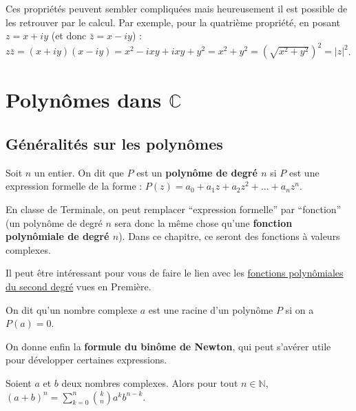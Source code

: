 	\begin{tip}
		Ces propriétés peuvent sembler compliquées mais heureusement il est possible de les retrouver par le calcul. Par exemple, pour la quatrième propriété, en posant $z = x+iy$ (et donc $\bar{z} = x-iy$) :
		\newpar
		$z\bar{z} = (x+iy)(x-iy) = x^2 - ixy + ixy + y^2 = x^2 + y^2 = \left(\sqrt{x^2 + y^2}\right)^2 = |z|^2$.
	\end{tip}

	\section{Polynômes dans \texorpdfstring{$\mathbb{C}$}{C}}

	\subsection{Généralités sur les polynômes}

	\begin{formula}[Définition]
		Soit $n$ un entier. On dit que $P$ est un \textbf{polynôme de degré $n$} si $P$ est une expression formelle de la forme : $P(z) = a_0 + a_1 z + a_2 z^2 + \dots + a_n z^n$.
	\end{formula}

	En classe de Terminale, on peut remplacer ``expression formelle'' par ``fonction'' (un polynôme de degré $n$ sera donc la même chose qu'une \textbf{fonction polynômiale de degré $n$}). Dans ce chapitre, ce seront des fonctions à valeurs complexes.

	\begin{tip}
		Il peut être intéressant pour vous de faire le lien avec les \href{https://bacomathiqu.es/cours/premiere/polynomes-second-degre/}{fonctions polynômiales du second degré} vues en Première.
	\end{tip}

	\begin{formula}
		On dit qu'un nombre complexe $a$ est une racine d'un polynôme $P$ si on a $P(a) = 0$.
	\end{formula}

	On donne enfin la \textbf{formule du binôme de Newton}, qui peut s'avérer utile pour développer certaines expressions.

	\begin{formula}
		Soient $a$ et $b$ deux nombres complexes.
		\newpar
		Alors pour tout $n \in \mathbb{N}$, $\displaystyle{(a + b)^n = \sum_{k = 0}^n \binom{k}{n} a^k b^{n-k}}$.
	\end{formula}

